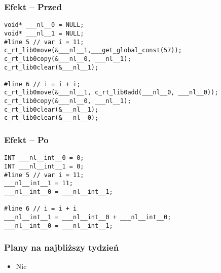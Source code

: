 \documentclass{beamer}
\begin{document}
	\begin{frame}[fragile]
		\frametitle{Efekt -- Przed}
		\begin{Verbatim}
void* ___nl__0 = NULL;
void* ___nl__1 = NULL;
#line 5 // var i = 11;
c_rt_lib0move(&___nl__1,___get_global_const(57));
c_rt_lib0copy(&___nl__0, ___nl__1);
c_rt_lib0clear(&___nl__1);

#line 6 // i = i + i;
c_rt_lib0move(&___nl__1, c_rt_lib0add(___nl__0, ___nl__0));
c_rt_lib0copy(&___nl__0, ___nl__1);
c_rt_lib0clear(&___nl__1);
c_rt_lib0clear(&___nl__0);
	\end{Verbatim}

	\end{frame}

	\begin{frame}[fragile]
		\frametitle{Efekt -- Po}
		\begin{Verbatim}
INT ___nl__int__0 = 0;
INT ___nl__int__1 = 0;
#line 5 // var i = 11;
___nl__int__1 = 11;
___nl__int__0 = ___nl__int__1;

#line 6 // i = i + i
___nl__int__1 = ___nl__int__0 + ___nl__int__0;
___nl__int__0 = ___nl__int__1;
	\end{Verbatim}

	\end{frame}

	\begin{frame}
		\frametitle{Plany na najbliższy tydzień}
		\begin{itemize}
		\item Nic
		\end{itemize}
	\end{frame}
\end{document}
